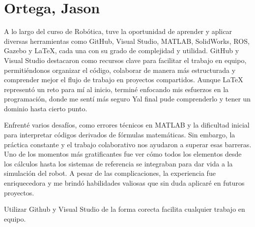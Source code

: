 \section{Ortega, Jason}
A lo largo del curso de Robótica, tuve la oportunidad de aprender y aplicar diversas herramientas como GitHub, Visual Studio, MATLAB, SolidWorks, ROS, Gazebo y LaTeX, cada una con su grado de complejidad y utilidad. GitHub y Visual Studio destacaron como recursos clave para facilitar el trabajo en equipo, permitiéndonos organizar el código, colaborar de manera más estructurada y comprender mejor el flujo de trabajo en proyectos compartidos. Aunque LaTeX representó un reto para mí al inicio, terminé enfocando mis esfuerzos en la programación, donde me sentí más seguro Yal final pude comprenderlo y tener un dominio hasta cierto punto.

Enfrenté varios desafíos, como errores técnicos en MATLAB y la dificultad inicial para interpretar códigos derivados de fórmulas matemáticas. Sin embargo, la práctica constante y el trabajo colaborativo nos ayudaron a superar esas barreras. Uno de los momentos más gratificantes fue ver cómo todos los elementos desde los cálculos hasta los sistemas de referencia se integraban para dar vida a la simulación del robot. A pesar de las complicaciones, la experiencia fue enriquecedora y me brindó habilidades valiosas que sin duda aplicaré en futuros proyectos.

Utilizar Github y Visual Studio de la forma corecta facilita cualquier trabajo en equipo.